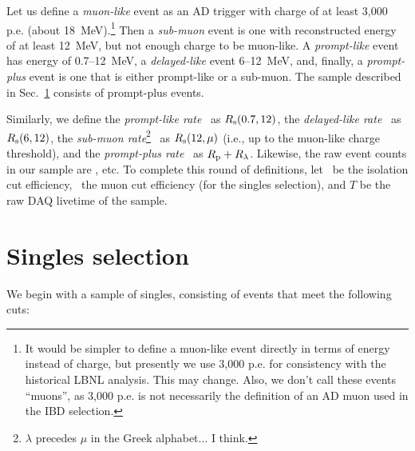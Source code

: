 \documentclass[../thesis.tex]{subfiles}
\begin{document}
Let us define a \emph{muon-like} event as an AD trigger with charge of at least
3,000 p.e. (about 18~MeV).\footnote{It would be simpler to define a muon-like
  event directly in terms of energy instead of charge, but presently we use
  3,000 p.e. for consistency with the historical LBNL analysis. This may change.
  Also, we don't call these events ``muons'', as 3,000 p.e. is not necessarily
  the definition of an AD muon used in the IBD selection.} Then a
\emph{sub-muon} event is one with reconstructed energy of at least 12~MeV, but
not enough charge to be muon-like. A \emph{prompt-like} event has energy of
0.7--12~MeV, a \emph{delayed-like} event 6--12~MeV, and, finally, a
\emph{prompt-plus} event is one that is either prompt-like or a sub-muon. The
sample described in Sec.~\ref{sec:singsel} consists of prompt-plus events.

Similarly, we define the \emph{prompt-like rate} \Rpro\ as $R_\mathrm{s}(0.7, 12)$, the \emph{delayed-like rate} \Rdel\ as $R_\mathrm{s}(6, 12)$, the \emph{sub-muon rate}\footnote{$\lambda$ precedes $\mu$ in the Greek alphabet... I think.} \Rsub\ as $R_\mathrm{s}(12, \mu)$ (i.e., up to the muon-like charge threshold), and the \emph{prompt-plus rate} \Rplu\ as $R_\mathrm{p} + R_\mathrm{\lambda}$. Likewise, the raw event counts in our sample are \Npro, etc. To complete this round of definitions, let \eisol\ be the isolation cut efficiency, \emu\ the muon cut efficiency (for the singles selection), and $T$ be the raw DAQ livetime of the sample.

\section{Singles selection}
\label{sec:singsel}

We begin with a sample of singles, consisting of events that meet the following cuts:

\end{document}
